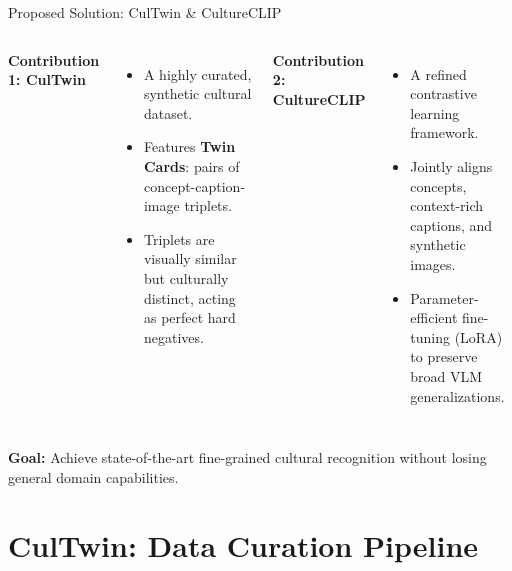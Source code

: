 \documentclass[aspectratio=169]{beamer}
\begin{document}
\begin{frame}{Proposed Solution: CulTwin \& CultureCLIP}
  
  \begin{columns}
    \textbf{\textcolor{medgreen}{Contribution 1: CulTwin}}
    \begin{itemize}
      \item A highly curated, synthetic cultural dataset.
      \item Features \textbf{Twin Cards}: pairs of concept-caption-image triplets.
      \item Triplets are visually similar but culturally distinct, acting as perfect hard negatives.
    \end{itemize}
    
    \textbf{\textcolor{medgreen}{Contribution 2: CultureCLIP}}
    \begin{itemize}
      \item A refined contrastive learning framework.
      \item Jointly aligns concepts, context-rich captions, and synthetic images.
      \item Parameter-efficient fine-tuning (LoRA) to preserve broad VLM generalizations.
    \end{itemize}
  \end{columns}

  \vspace{0.8cm}
  \begin{center}
      \textbf{Goal:} Achieve state-of-the-art fine-grained cultural recognition without losing general domain capabilities.
  \end{center}
  
\end{frame}

\section{CulTwin: Data Curation Pipeline}
\end{document}
